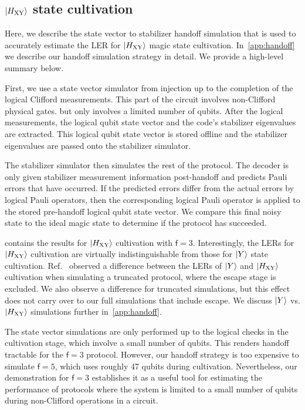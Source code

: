 \documentclass[%
    aps, 
    physrev,
    reprint,
]{revtex4-2}
\newcommand{\fd}[1]{\mathsf{f}=#1}
\newcommand{\XY}{_\mathrm{XY}}
\begin{document}
\subsection{\texorpdfstring{$\ket{H\XY}$}{H} state cultivation}\label{sec:error-estimation}
 
Here, we describe the state vector to stabilizer handoff simulation that is used to accurately estimate the LER for $\ket{H\XY}$ magic state cultivation.
In~\cref{app:handoff} we describe our handoff simulation strategy in detail.
We provide a high-level summary below.

First, we use a state vector simulator from injection up to the completion of the logical Clifford measurements.
This part of the circuit involves non-Clifford physical gates. 
but only involves a limited number of qubits. 
After the logical measurements, the logical qubit state vector and the code's stabilizer eigenvalues are extracted. 
This logical qubit state vector is stored offline and the stabilizer eigenvalues are passed onto the stabilizer simulator. 

The stabilizer simulator then simulates the rest of the protocol.
The decoder is only given stabilizer measurement information post{-}handoff and predicts Pauli errors that have occurred.
If the predicted errors differ from the actual errors by logical Pauli operators, then the corresponding logical Pauli operator is applied to the stored pre-handoff 
logical qubit state vector. 
We compare this final noisy state to the ideal magic state to determine if the protocol has succeeded. 

 contains the results for $\ket{H\XY}$ cultivation with $\fd3$. 
Interestingly, the LERs for $\ket{H\XY}$ cultivation are virtually indistinguishable from those for $\ket{Y}$ state cultivation. 
Ref.~\cite{gidney2024magic} observed a difference between the LERs of $\ket{Y}$ and $\ket{H\XY}$ cultivation when simulating a truncated protocol, where the escape stage is excluded.
We also observe a difference for truncated simulations, but this effect does not carry over to our full simulations that include escape.
We discuss $\ket{Y}$ vs. $\ket{H\XY}$ simulations further in~\cref{app:handoff}. 

The state vector simulations are only performed up to the logical checks in the cultivation stage, which involve a small number of qubits.
This renders handoff tractable for the $\fd3$ protocol.  
However, our handoff strategy is too expensive to simulate $\fd5$, which uses roughly 47 qubits during cultivation.
Nevertheless, our demonstration for $\fd3$ establishes it as a useful tool for estimating the performance of protocols where the system is limited to a small number of qubits during non-Clifford operations in a circuit.
\end{document}
